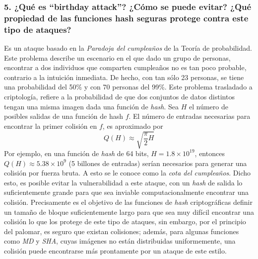 \documentclass[12pt]{article}
\begin{document}
\subsubsection*{5. ¿Qué es “birthday attack”? ¿Cómo se puede evitar? ¿Qué propiedad de las funciones hash seguras protege contra este tipo de ataques?}
Es un ataque basado en la \textit{Paradoja del cumpleaños} de la Teoría
de probabilidad. Este problema describe un escenario en el que dado un
grupo de personas, encontrar a dos individuos que comparten cumpleaños
no es tan poco probable, contrario a la intuición inmediata. De hecho,
con tan sólo 23 personas, se tiene una probabilidad del 50\% y con 70 personas del 99\%. Este problema trasladado a criptología, refiere a la
probabilidad de que dos conjuntos de datos distintos tengan una misma
imagen dada una función de \textit{hash}.
Sea $H$ el número de posibles salidas de una función de hash $f$. El número de entradas necesarias para encontrar la primer colisión en $f$, es aproximado por
\begin{equation}
  Q(H) \approx \sqrt{\frac{\pi}{2}H}
\end{equation}
Por ejemplo, en una función de \textit{hash} de 64 bits, $H = 1.8 \times 10^{19}$, entonces $Q(H) \approx 5.38 \times 10^{9}$ (5 billones de entradas) serían necesarios para generar una colisión por fuerza bruta. A esto se le conoce como la \textit{cota del cumpleaños}. Dicho esto, es posible evitar la vulnerabilidad a este ataque, con un \textit{hash} de salida lo suficientemente grande para que sea inviable computacionalmente encontrar una colisión. Precisamente es el objetivo de las funciones de \textit{hash} criptográficas definir un tamaño de bloque suficientemente
largo para que sea muy difícil encontrar una colisión lo que los protege
de este tipo de ataques, sin embargo, por el principio del palomar,
es seguro que existan colisiones; además, para algunas funciones como
\textit{MD} y \textit{SHA}, cuyas imágenes no están distribuidas uniformemente, una colisión puede encontrarse más prontamente por un ataque de este estilo.
\end{document}
